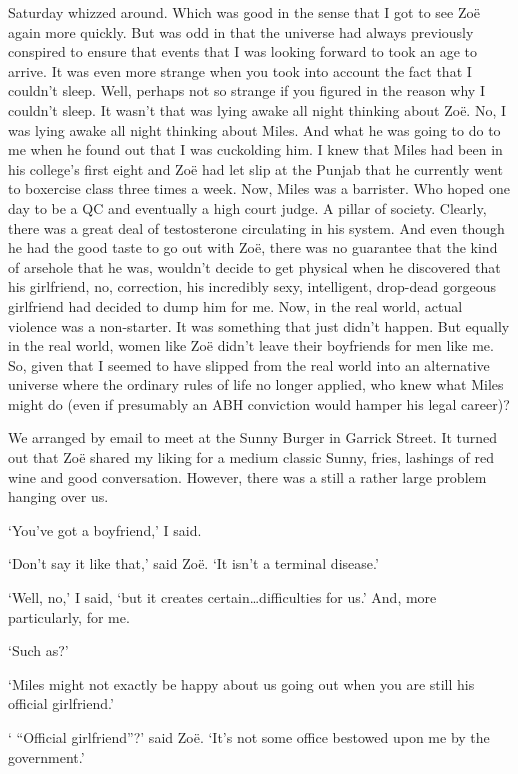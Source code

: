 Saturday whizzed around. Which was good in the sense that I got to
see Zoë again more quickly. But was odd in that the universe had
always previously conspired to ensure that events that I was looking
forward to took an age to arrive. It was even more strange when you
took into account the fact that I couldn't sleep. Well, perhaps not
so strange if you figured in the reason why I couldn't sleep. It
wasn't that was lying awake all night thinking about Zoë. No, I
was lying awake all night thinking about Miles. And what he was
going to do to me when he found out that I was cuckolding him. I
knew that Miles had been in his college's first eight and Zoë had let
slip at the Punjab that he currently went to boxercise class three
times a week. Now, Miles was a barrister. Who hoped one day to be a
QC and eventually a high court judge. A pillar of society. Clearly,
there was a great deal of testosterone circulating in his system. And
even though he had the good taste to go out with Zoë, there was
no guarantee that the kind of arsehole that he was, wouldn't decide
to get physical when he discovered that his girlfriend, no,
correction, his incredibly sexy, intelligent, drop-dead gorgeous
girlfriend had decided to dump him for {\twelveit me}. Now, in the real world,
actual violence was a non-starter. It was something that just didn't
happen. But equally in the real world, women like Zoë didn't
leave their boyfriends for men like me. So, given that I seemed to have
slipped from the real world into an alternative universe where the
ordinary rules of life no longer applied, who knew what Miles might
do (even if presumably an ABH conviction would hamper his legal career)?

We arranged by email to meet at the Sunny Burger in Garrick Street. It
turned out that Zoë shared my liking for a medium
classic Sunny, fries, lashings of red wine and good conversation.
However, there was a still a rather large problem hanging over us.

`You've got a boyfriend,' I said.

`Don't say it like that,' said Zoë. `It isn't a terminal
disease.'

`Well, no,' I said, `but it creates certain\dots difficulties for
us.' And, more particularly, for me.

`Such as?'

`Miles might not exactly be happy about us going out when you are
still his official girlfriend.'

` ``Official girlfriend''?' said Zoë. `It's not some office
bestowed upon me by the government.'

